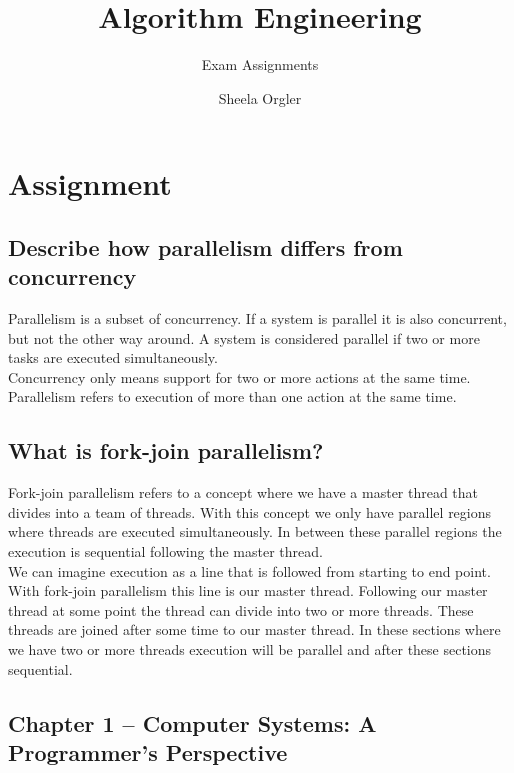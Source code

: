 \documentclass[runningheads]{llncs}
\begin{document}
\title{Algorithm Engineering}
\subtitle{Exam Assignments}


\author{Sheela Orgler}

\maketitle

%

\section{Assignment}

\subsection{Describe how parallelism differs from concurrency}
Parallelism is a subset of concurrency. If a system is parallel it is also concurrent, but not the other way around. A system is considered parallel if two or more tasks are executed simultaneously.
\\
Concurrency only means support for two or more actions at the same time. Parallelism refers to execution of more than one action at the same time.

\subsection{What is fork-join parallelism?}
Fork-join parallelism refers to a concept where we have a master thread that divides into a team of threads. With this concept we only have parallel regions where threads are executed simultaneously. In between these parallel regions the execution is sequential following the master thread. 
\\
We can imagine execution as a line that is followed from starting to end point. With fork-join parallelism this line is our master thread. Following our master thread at some point the thread can divide into two or more threads. These threads are joined after some time to our master thread. In these sections where we have two or more threads execution will be parallel and after these sections sequential. 


\subsection {Chapter 1 – Computer Systems: A Programmer’s Perspective}
\end{document}
